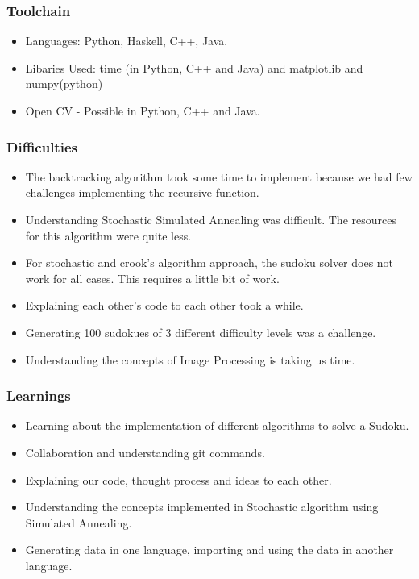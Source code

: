 \documentclass{beamer}
\begin{document}
\begin{frame}
     \frametitle{Toolchain}
     \begin{itemize}
          \item Languages: Python, Haskell, C++, Java.
          \item Libaries Used: time (in Python, C++ and Java) and matplotlib and numpy(python)
          \item Open CV - Possible in Python, C++ and Java.
     \end{itemize}
\end{frame}

\begin{frame}
     \frametitle{Difficulties}
     \begin{itemize}
          \item The backtracking algorithm took some time to implement because we had few challenges implementing the recursive function.
		  \item Understanding Stochastic Simulated Annealing was difficult. The resources for this algorithm were quite less.
	      \item For stochastic and crook's algorithm approach, the sudoku solver does not work for all cases. This requires a little bit of work.
		  \item Explaining each other's code to each other took a while.
		  \item Generating 100 sudokues of 3 different difficulty levels was a challenge.
		  \item Understanding the concepts of Image Processing is taking us time.
\end{itemize}
\end{frame}
\begin{frame}
     \frametitle{Learnings}
     \begin{itemize}
     \item Learning about the implementation of different algorithms to solve a Sudoku.
     \item Collaboration and understanding git commands.
	 \item Explaining our code, thought process and ideas to each other.
	 \item Understanding the concepts implemented in Stochastic algorithm using Simulated Annealing.
	 \item Generating data in one language, importing and using the data in another language.
\end{itemize}         
\end{frame}
\end{document}
